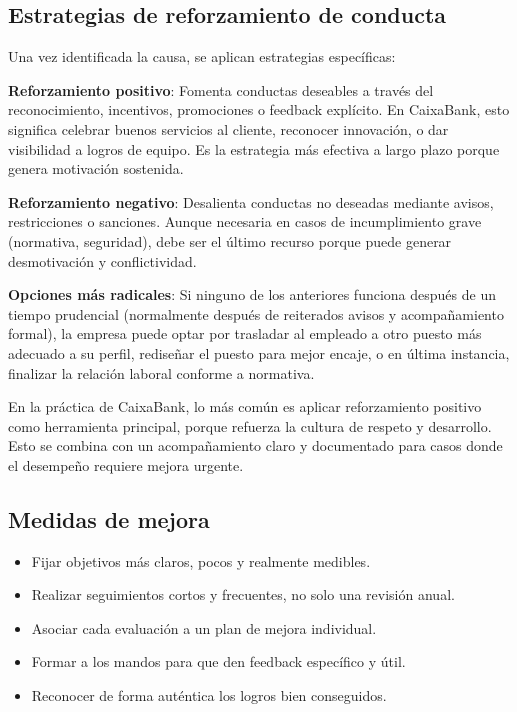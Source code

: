 \subsection*{Estrategias de reforzamiento de conducta}
Una vez identificada la causa, se aplican estrategias específicas:

\textbf{Reforzamiento positivo}: Fomenta conductas deseables a través del reconocimiento, incentivos, promociones o feedback explícito. En CaixaBank, esto significa celebrar buenos servicios al cliente, reconocer innovación, o dar visibilidad a logros de equipo. Es la estrategia más efectiva a largo plazo porque genera motivación sostenida.

\textbf{Reforzamiento negativo}: Desalienta conductas no deseadas mediante avisos, restricciones o sanciones. Aunque necesaria en casos de incumplimiento grave (normativa, seguridad), debe ser el último recurso porque puede generar desmotivación y conflictividad.

\textbf{Opciones más radicales}: Si ninguno de los anteriores funciona después de un tiempo prudencial (normalmente después de reiterados avisos y acompañamiento formal), la empresa puede optar por trasladar al empleado a otro puesto más adecuado a su perfil, rediseñar el puesto para mejor encaje, o en última instancia, finalizar la relación laboral conforme a normativa.

En la práctica de CaixaBank, lo más común es aplicar reforzamiento positivo como herramienta principal, porque refuerza la cultura de respeto y desarrollo. Esto se combina con un acompañamiento claro y documentado para casos donde el desempeño requiere mejora urgente.

\subsection*{Medidas de mejora}
\begin{itemize}[leftmargin=*]
	\item Fijar objetivos más claros, pocos y realmente medibles.
	\item Realizar seguimientos cortos y frecuentes, no solo una revisión anual.
	\item Asociar cada evaluación a un plan de mejora individual.
	\item Formar a los mandos para que den feedback específico y útil.
	\item Reconocer de forma auténtica los logros bien conseguidos.
\end{itemize}


